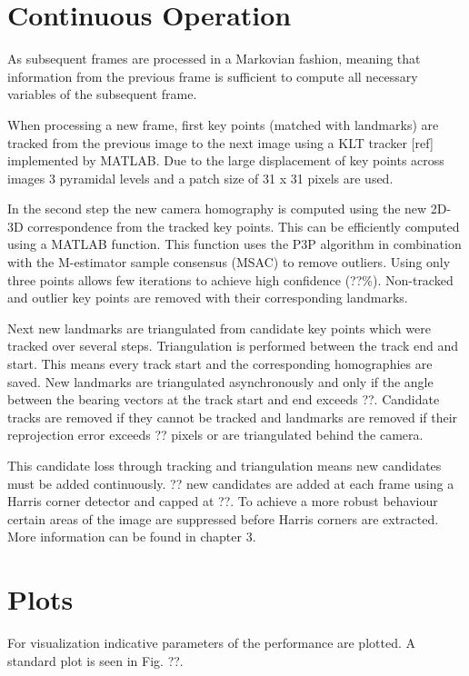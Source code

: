 \section{Continuous Operation}
As subsequent frames are processed in a Markovian fashion, meaning that information from the previous frame is sufficient to compute all necessary variables of the subsequent frame. \par
When processing a new frame, first key points (matched with landmarks) are tracked from the previous image to the next image using a KLT tracker [ref] implemented by MATLAB. Due to the large displacement of key points across images 3 pyramidal levels and a patch size of 31 x 31 pixels are used. \par
In the second step the new camera homography is computed using the new 2D-3D correspondence from the tracked key points. This can be efficiently computed using a MATLAB function. This function uses the P3P algorithm in combination with the M-estimator sample consensus (MSAC) to remove outliers. Using only three points allows few iterations to achieve high confidence (??\%). Non-tracked and outlier key points are removed with their corresponding landmarks.\par
Next new landmarks are triangulated from candidate key points which were tracked over several steps. Triangulation is performed between the track end and start. This means every track start and the corresponding homographies are saved. New landmarks are triangulated asynchronously and only if the angle between the bearing vectors at the track start and end exceeds ??. Candidate tracks are removed if they cannot be tracked and landmarks are removed if their reprojection error exceeds ?? pixels or are triangulated behind the camera.\par
This candidate loss through tracking and triangulation means new candidates must be added continuously. ?? new candidates are added at each frame using a Harris corner detector and capped at ??. To achieve a more robust behaviour certain areas of the image are suppressed before Harris corners are extracted. More information can be found in chapter 3. 

\section{Plots}
For visualization indicative parameters of the performance are plotted. A standard plot is seen in Fig. ??.  


